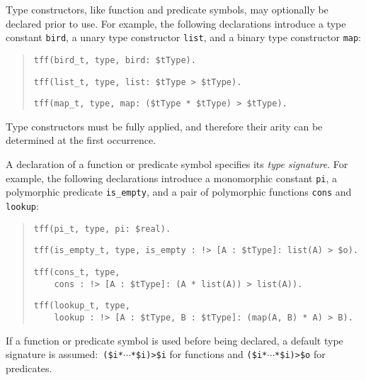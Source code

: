 
 Type constructors,
like function and predicate symbols,
may optionally be declared prior to use.
For example, the following declarations introduce a type
constant {\tt bird}, a unary type constructor {\tt list},
and a binary type constructor {\tt map}:
\begin{quote}
\verb+tff(bird_t, type, bird: $tType).+
\par\smallskip
\verb+tff(list_t, type, list: $tType > $tType).+
\par\smallskip
\verb+tff(map_t, type, map: ($tType * $tType) > $tType).+
\end{quote}
Type constructors must be fully applied, and therefore
their arity can be %
determined at the first occurrence.

A declaration of a function or predicate symbol specifies its {\em type
signature}. For example, the following declarations introduce a monomorphic
constant {\tt pi}, a polymorphic predicate
{\tt is\_empty}, and a pair of polymorphic functions {\tt cons} and {\tt lookup}:
\begin{quote}
\verb+tff(pi_t, type, pi: $real).+
\par\smallskip
\verb+tff(is_empty_t, type, is_empty : !> [A : $tType]: list(A) > $o).+\kern-10mm
\par\smallskip
\verb+tff(cons_t, type,+\\
\verb+    cons : !> [A : $tType]: (A * list(A)) > list(A)).+
\par\smallskip
\verb+tff(lookup_t, type,+\\
\verb+    lookup : !> [A : $tType, B : $tType]: (map(A, B) * A) > B).+
\end{quote}
If a function or predicate symbol is used before being declared, a
default type signature is assumed:\ {\tt (\$i\;*\;${\cdots}$\;*\;\$i)\;>\;\$i}
for functions and {\tt (\$i\;*\;${\cdots}$\;*\;\$i)\;>\;\$o} for predicates.

